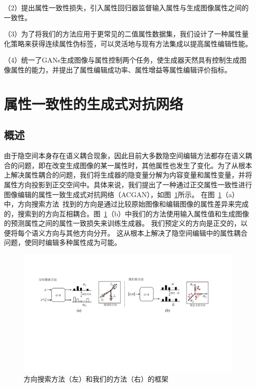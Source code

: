 （2）提出属性一致性损失，引入属性回归器监督输入属性与生成图像属性之间的一致性。

（3）为了将我们的方法应用于更常见的二值属性数据集，我们设计了一种属性量化策略来获得连续属性伪标签，可以灵活地与现有方法集成以提高属性编辑性能。

（4）统一了GANs生成图像与属性控制两个任务，使生成器天然具有控制生成图像属性的能力，并提出了属性编辑成功率、属性增益等属性编辑评价指标。

\section{属性一致性的生成式对抗网络}

\subsection{概述}
由于隐空间本身存在语义耦合现象，因此目前大多数隐空间编辑方法都存在语义耦合的问题，即在改变生成图像的某一属性时，其他属性也发生了变化。为了从根本上解决属性耦合的问题，我们将生成器的隐变量分解为内容变量和属性变量，并将属性方向投影到正交空间中。具体来说，我们提出了一种通过正交属性一致性进行图像编辑的属性一致生成式对抗网络（ACGAN），如图~\ref{fig:framework}所示。 在图~\ref{fig:framework}（a）中，方向搜索方法~\cite{icml2020, iclr2021}找到的方向是通过比较原始图像和编辑图像的属性差异来完成的，搜索到的方向互相耦合。图~\ref{fig:framework}（b）中我们的方法使用输入属性值和生成图像的预测属性之间的属性一致损失来训练生成器。 我们预定义的方向是正交的，以便将每个语义方向与其他方向分开。
这从根本上解决了隐空间编辑中的属性耦合问题，使同时编辑多种属性成为可能。

\begin{figure}
    \centering
    \includegraphics[width=1\linewidth]{figures/ACGAN/framework.pdf}
    \caption{方向搜索方法（左）和我们的方法（右）的框架}
    \label{fig:framework}
  \end{figure}

